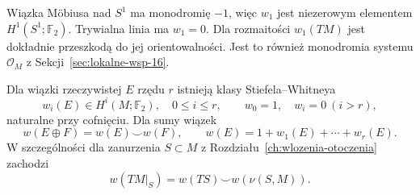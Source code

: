 \begin{przyklad}
Wiązka Möbiusa nad $S^1$
ma monodromię $-1$,
więc $w_1$ jest
niezerowym elementem
$H^1(S^1;\mathbb F_2)$.
Trywialna linia ma $w_1=0$.
Dla rozmaitości
$w_1(TM)$ jest dokładnie
przeszkodą do jej
orientowalności.
Jest to również
monodromia systemu
$\mathcal O_M$
z Sekcji~\ref{sec:lokalne-wsp-16}.
\end{przyklad}

\begin{twierdzenie}
\label{thm:wi-klasy-16}
Dla wiązki rzeczywistej
$E$ rzędu $r$ istnieją
klasy Stiefela--Whitneya
\[
 w_i(E)\in H^i(M;\mathbb F_2),
 \quad 0\leq i\leq r,\qquad
 w_0=1,\quad w_i=0\ (i>r),
\]
naturalne przy cofnięciu.
Dla sumy wiązek
\[
 w(E\oplus F)=w(E)\smile w(F),
 \qquad w(E)=1+w_1(E)+\cdots+w_r(E).
\]
W szczególności dla zanurzenia
$S\subset M$ z
Rozdziału~\ref{ch:wlozenia-otoczenia}
zachodzi
\begin{equation}\label{eq:w-normalne-16}
 w(TM|_S)=w(TS)\smile w(\nu(S,M)).
\end{equation}
\end{twierdzenie}
